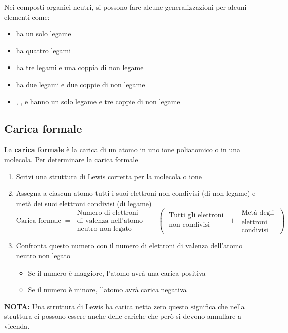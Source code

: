 Nei composti organici neutri, si possono fare alcune generalizzazioni per alcuni elementi come:
\begin{itemize}
	\item {} ha un solo legame
	\item {} ha quattro legami
	\item {} ha tre legami e una coppia di non legame
	\item {} ha due legami e due coppie di non legame
	\item {}, ,  e  hanno un solo legame e tre coppie di non legame
\end{itemize}

\subsection{Carica formale}
La \textbf{carica formale} è la carica di un atomo in uno ione poliatomico o in una molecola.
Per determinare la carica formale
\begin{enumerate}
	\item Scrivi una struttura di Lewis corretta per la molecola o ione
	\item Assegna a ciascun atomo tutti i suoi elettroni non condivisi (di non legame) e metà dei suoi elettroni condivisi (di legame)
	      \begin{equation*}
		      \text{Carica formale} \;=\;
		      \begin{matrix}
			      \text{Numero di elettroni}   \\
			      \text{di valenza nell'atomo} \\
			      \text{neutro non legato}
		      \end{matrix}
		      \;-\; \left(\;
		      \begin{matrix}
				      \text{Tutti gli elettroni} \\
				      \text{non condivisi}       \\
			      \end{matrix}
		      \;+\;
		      \begin{matrix}
				      \text{Metà degli} \\
				      \text{elettroni}  \\
				      \text{condivisi}
			      \end{matrix}\;
		      \right)
	      \end{equation*}
	\item Confronta questo numero con il numero di elettroni di valenza dell'atomo neutro non legato
	      \begin{itemize}
		      \item Se il numero è maggiore, l'atomo avrà una carica positiva
		      \item Se il numero è minore, l'atomo avrà carica negativa
	      \end{itemize}
\end{enumerate}

\begin{framed}
	\noindent\textbf{NOTA:}
	Una struttura di Lewis ha carica netta zero questo significa che nella struttura ci possono essere anche delle cariche che però si devono annullare a vicenda.
\end{framed}
